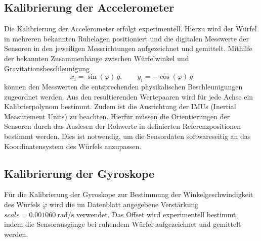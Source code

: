         \subsection{Kalibrierung der Accelerometer}
            Die Kalibrierung der Accelerometer erfolgt experimentell. Hierzu wird der Würfel in mehreren bekannten Ruhelagen positioniert und die digitalen Messwerte der Sensoren in den jeweiligen Messrichtungen aufgezeichnet und gemittelt. Mithilfe der bekannten Zusammenhänge zwischen Würfelwinkel und Gravitationsbeschleunigung
            \[
                \ddot{x}_i = \sin(\varphi)\, g,
                \qquad
                \ddot{y}_i = -\cos(\varphi)\, g
            \]
            können den Messwerten die entsprechenden physikalischen Beschleunigungen zugeordnet werden. Aus den resultierenden Wertepaaren wird für jede Achse ein Kalibrierpolynom bestimmt. Zudem ist die Ausrichtung der IMUs (Inertial Measurement Units) zu beachten. Hierfür müssen die Orientierungen der Sensoren durch das Auslesen der Rohwerte in definierten Referenzpositionen bestimmt werden. Dies ist notwendig, um die Sensordaten softwareseitig an das Koordinatensystem des Würfels anzupassen.

        \subsection{Kalibrierung der Gyroskope}
            Für die Kalibrierung der Gyroskope zur Bestimmung der Winkelgeschwindigkeit des Würfels $\dot{\varphi}$ wird die im Datenblatt angegebene Verstärkung $scale = \SI{0.001060}{\radian\per\second}$ verwendet. Das Offset wird experimentell bestimmt, indem die Sensorausgänge bei ruhendem Würfel aufgezeichnet und gemittelt werden.
    
